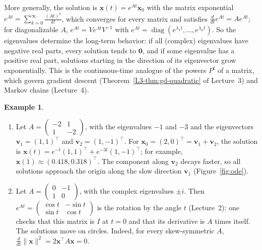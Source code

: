 \documentclass[11pt]{article}
\newcommand{\norm}[1]{\lVert #1 \rVert}
\theoremstyle{definition}
\newtheorem{example}[definition]{Example}
\theoremstyle{plain}
\theoremstyle{remark}
\DeclareMathOperator{\diag}{diag}
\begin{document}
More generally, the solution is $\mathbf{x}(t) = e^{At}\mathbf{x}_0$ with the matrix exponential $e^{At} = \sum_{k=0}^\infty \frac{(At)^k}{k!}$, which converges for every matrix and satisfies $\frac{d}{dt}e^{At} = Ae^{At}$; for diagonalizable $A$, $e^{At} = Ve^{\Lambda t}V^{-1}$ with $e^{\Lambda t} = \diag(e^{\lambda_1 t}, \ldots, e^{\lambda_n t})$. So the eigenvalues determine the long-term behavior: if all (complex) eigenvalues have negative real parts, every solution tends to $\mathbf{0}$, and if some eigenvalue has a positive real part, solutions starting in the direction of its eigenvector grow exponentially. This is the continuous-time analogue of the powers $P^t$ of a matrix, which govern gradient descent (Theorem~\ref{L3-thm:gd-quadratic} of Lecture~3) and Markov chains (Lecture~4).

\begin{example}\label{ex:linear-ode}
    \begin{enumerate}
        \item Let $A = \begin{pmatrix} -2 & 1 \\ 1 & -2 \end{pmatrix}$, with the eigenvalues $-1$ and $-3$ and the eigenvectors $\mathbf{v}_1 = (1, 1)^\top$ and $\mathbf{v}_2 = (1, -1)^\top$. For $\mathbf{x}_0 = (2, 0)^\top = \mathbf{v}_1 + \mathbf{v}_2$, the solution is $\mathbf{x}(t) = e^{-t}(1, 1)^\top + e^{-3t}(1, -1)^\top$; for example, $\mathbf{x}(1) \approx (0.418, 0.318)^\top$. The component along $\mathbf{v}_2$ decays faster, so all solutions approach the origin along the slow direction $\mathbf{v}_1$ (Figure~\ref{fig:ode}).
        \item Let $A = \begin{pmatrix} 0 & -1 \\ 1 & 0 \end{pmatrix}$, with the complex eigenvalues $\pm i$. Then $e^{At} = \begin{pmatrix} \cos t & -\sin t \\ \sin t & \cos t \end{pmatrix}$ is the rotation by the angle $t$ (Lecture~2): one checks that this matrix is $I$ at $t = 0$ and that its derivative is $A$ times itself. The solutions move on circles. Indeed, for every skew-symmetric $A$, $\frac{d}{dt}\norm{\mathbf{x}}^2 = 2\mathbf{x}^\top A\mathbf{x} = 0$.
    \end{enumerate}
\end{example}
\end{document}
